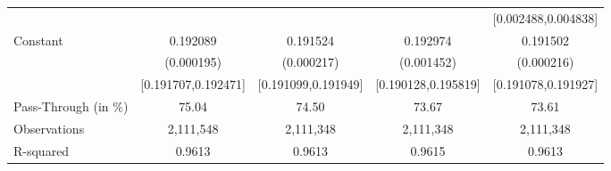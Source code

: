 {\begin{tabular}{l*{4}{c}}
                    &                     &                     &                     &[0.002488,0.004838]         \\
Constant            &    0.192089\sym{***}&    0.191524\sym{***}&    0.192974\sym{***}&    0.191502\sym{***}\\
                    &  (0.000195)         &  (0.000217)         &  (0.001452)         &  (0.000216)         \\
                    &[0.191707,0.192471]         &[0.191099,0.191949]         &[0.190128,0.195819]         &[0.191078,0.191927]         \\
\midrule
Pass-Through (in \%)&       75.04         &       74.50         &       73.67         &       73.61         \\
Observations        &   2,111,548         &   2,111,348         &   2,111,348         &   2,111,348         \\
R-squared           &      0.9613         &      0.9613         &      0.9615         &      0.9613         \\
\bottomrule
\end{tabular}
}

